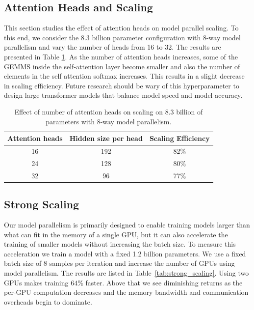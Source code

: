\subsection{Attention Heads and Scaling} 
This section studies the effect of attention heads on model parallel scaling. To this end, we consider the 8.3 billion parameter configuration with 8-way model parallelism and vary the number of heads from 16 to 32. The results are presented in Table \ref{tab:attn_head_scaling}. As the number of attention heads increases, some of the GEMMS inside the self-attention layer become smaller and also the number of elements in the self attention softmax increases. This results in a slight decrease in scaling efficiency. Future research should be wary of this hyperparameter to design large transformer models that balance model speed and model accuracy.

\begin{table}[hbt!]
\footnotesize
\begin{center}
\caption{Effect of number of attention heads on scaling on 8.3 billion of parameters with 8-way model parallelism.}
\vskip 0.15in
\label{tab:attn_head_scaling}
\begin{tabular}{c|c|c}
\hline \hline
Attention heads & Hidden size per head & Scaling Efficiency \\ \hline
16 & 192 & 82\% \\
24 & 128 & 80\% \\
32 & 96 & 77\% \\ \hline \hline
\end{tabular}
\end{center}
\vskip -0.1in
\end{table}


\subsection{Strong Scaling}

Our model parallelism is primarily designed to enable training models larger than what can fit in the memory of a single GPU, but it can also accelerate the training of smaller models without increasing the batch size. To measure this acceleration we train a model with a fixed 1.2 billion parameters. We use a fixed batch size of 8 samples per iteration and increase the number of GPUs using model parallelism. The results are listed in Table~\ref{tab:strong_scaling}. Using two GPUs makes training $64\%$ faster. Above that we see diminishing returns as the per-GPU computation decreases and the memory bandwidth and communication overheads begin to dominate.


